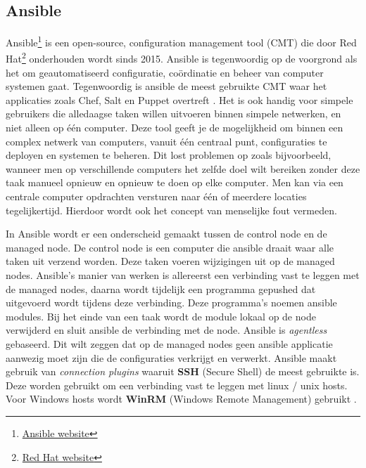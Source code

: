 \subsection{Ansible}  
\label{ch:ansible}

Ansible\footnote{\href{https://www.ansible.com}{Ansible website}} is een open-source, configuration management tool (CMT) die door Red Hat\footnote{\href{https://www.redhat.com}{Red Hat website}} onderhouden wordt sinds 2015. Ansible is tegenwoordig op de voorgrond als het om geautomatiseerd configuratie, coördinatie en beheer van computer systemen gaat. Tegenwoordig is ansible de meest gebruikte CMT waar het applicaties zoals Chef, Salt en Puppet overtreft \autocite{Rayome2019}. Het is ook handig voor simpele gebruikers die alledaagse taken willen uitvoeren binnen simpele netwerken, en niet alleen op één computer. Deze tool geeft je de mogelijkheid om binnen een complex netwerk van computers, vanuit één centraal punt, configuraties te deployen en systemen te beheren. Dit lost problemen op zoals bijvoorbeeld, wanneer men op verschillende computers het zelfde doel wilt bereiken zonder deze taak manueel opnieuw en opnieuw te doen op elke computer. Men kan via een centrale computer opdrachten versturen naar één of meerdere locaties tegelijkertijd. Hierdoor wordt ook het concept van menselijke fout vermeden.

In Ansible wordt er een onderscheid gemaakt tussen de control node en de managed node. De control node is een computer die ansible draait waar alle taken uit verzend worden. Deze taken voeren wijzigingen uit op de managed nodes. Ansible's manier van werken is allereerst een verbinding vast te leggen met de managed nodes, daarna wordt tijdelijk een programma gepushed dat uitgevoerd wordt tijdens deze verbinding. Deze programma’s noemen ansible modules. Bij het einde van een taak wordt de module lokaal op de node verwijderd en sluit ansible de verbinding met de node. Ansible is \textit{agentless} gebaseerd. Dit wilt zeggen dat op de managed nodes geen ansible applicatie aanwezig moet zijn die de configuraties verkrijgt en verwerkt. Ansible maakt gebruik van \textit{connection plugins} waaruit \textbf{SSH} (Secure Shell) de meest gebruikte is. Deze worden gebruikt om een verbinding vast te leggen met linux / unix hosts. Voor Windows hosts wordt \textbf{WinRM} (Windows Remote Management) gebruikt \autocite{RedHatAnsible2021}. 

